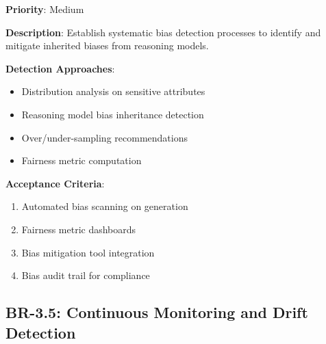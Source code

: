 \begin{tcolorbox}[colback=yellow!5,colframe=yellow!70,title=BR-3.4: Systematic Bias Detection]
\textbf{Priority}: Medium

\textbf{Description}: Establish systematic bias detection processes to identify
and mitigate inherited biases from reasoning models.

\textbf{Detection Approaches}:
\begin{itemize}
  \item Distribution analysis on sensitive attributes
  \item Reasoning model bias inheritance detection
  \item Over/under-sampling recommendations
  \item Fairness metric computation
\end{itemize}

\textbf{Acceptance Criteria}:
\begin{enumerate}
  \item Automated bias scanning on generation
  \item Fairness metric dashboards
  \item Bias mitigation tool integration
  \item Bias audit trail for compliance
\end{enumerate}
\end{tcolorbox}

\subsection{BR-3.5: Continuous Monitoring and Drift Detection}

